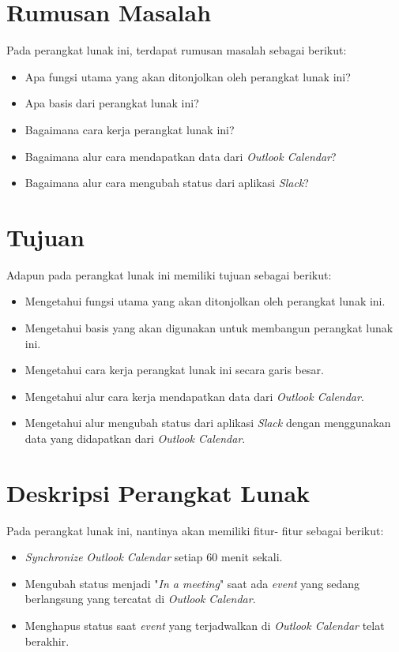 \documentclass[a4paper,twoside]{article}
\begin{document}
\section{Rumusan Masalah}
Pada perangkat lunak ini, terdapat rumusan masalah sebagai berikut:
\begin{itemize}
	\item Apa fungsi utama yang akan ditonjolkan oleh perangkat lunak ini?
	\item Apa basis dari perangkat lunak ini?  
	\item Bagaimana cara kerja perangkat lunak ini? 
	\item Bagaimana alur cara mendapatkan data dari \textit{Outlook Calendar}?
	\item Bagaimana alur cara mengubah status dari aplikasi \textit{Slack}? 
	
\end{itemize}

\section{Tujuan}
Adapun pada perangkat lunak ini memiliki tujuan sebagai berikut:
\begin{itemize}
	\item Mengetahui fungsi utama yang akan ditonjolkan oleh perangkat lunak ini. 
	\item Mengetahui basis yang akan digunakan untuk membangun perangkat lunak ini.   
	\item Mengetahui cara kerja perangkat lunak ini secara garis besar. 
	\item Mengetahui alur cara kerja mendapatkan data dari \textit{Outlook Calendar}.  
	\item Mengetahui alur mengubah status dari aplikasi \textit{Slack} dengan menggunakan data yang didapatkan dari \textit{Outlook Calendar}.  
	
\end{itemize}

\section{Deskripsi Perangkat Lunak}
Pada perangkat lunak ini, nantinya akan memiliki fitur- fitur sebagai berikut:
\begin{itemize}
	\item \textit{Synchronize} \textit{Outlook Calendar} setiap 60 menit sekali. 
	\item Mengubah status menjadi "\textit{In a meeting}" saat ada \textit{event} yang sedang berlangsung yang tercatat di \textit{Outlook Calendar}. 
	\item Menghapus status saat \textit{event} yang terjadwalkan di \textit{Outlook Calendar} telat berakhir. 
	
\end{itemize}
\end{document}

